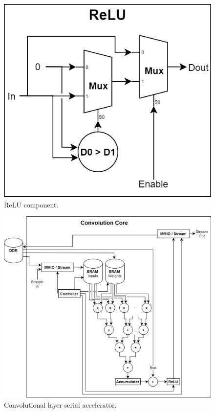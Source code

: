 \begin{figure} [H]
	\centering
	\includegraphics[scale=0.4]{Images/Platform/ReLU_component.png}
	\decoRule
	\caption[ReLU component]{ReLU component.}
	\label{fig:relu-component}
\end{figure}



\begin{figure} [H]
	\centering
	\includegraphics[width=\textwidth]{Images/Platform/Conv_core_row_parallel.png}
	\decoRule
	\caption[Convolutional layer serial accelerator]{Convolutional layer serial accelerator.}
	\label{fig:conv-core-row-parallel}
\end{figure}

